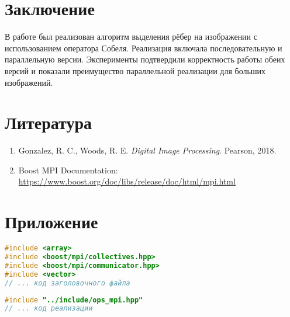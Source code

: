 \documentclass[12pt]{article}
\begin{document}
\newpage
\section*{Заключение}
В работе был реализован алгоритм выделения рёбер на изображении с использованием оператора Собеля. Реализация включала последовательную и параллельную версии. Эксперименты подтвердили корректность работы обеих версий и показали преимущество параллельной реализации для больших изображений.

\newpage
\section*{Литература}
\begin{enumerate}
    \item Gonzalez, R. C., Woods, R. E. \textit{Digital Image Processing}. Pearson, 2018.
    \item Boost MPI Documentation: \url{https://www.boost.org/doc/libs/release/doc/html/mpi.html}
\end{enumerate}

\newpage
\section*{Приложение}
\begin{lstlisting}[language=C++,caption={Заголовочный файл Sobel},label={lst:header}]
#include <array>
#include <boost/mpi/collectives.hpp>
#include <boost/mpi/communicator.hpp>
#include <vector>
// ... код заголовочного файла
\end{lstlisting}
\begin{lstlisting}[language=C++,caption={Реализация Sobel},label={lst:implementation}]
#include "../include/ops_mpi.hpp"
// ... код реализации
\end{lstlisting}
\end{document}
